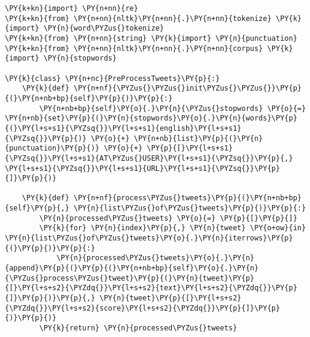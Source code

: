     \begin{tcolorbox}[breakable, size=fbox, boxrule=1pt, pad at break*=1mm,colback=cellbackground, colframe=cellborder]
\begin{Verbatim}[commandchars=\\\{\}]
\PY{k+kn}{import} \PY{n+nn}{re}
\PY{k+kn}{from} \PY{n+nn}{nltk}\PY{n+nn}{.}\PY{n+nn}{tokenize} \PY{k}{import} \PY{n}{word\PYZus{}tokenize}
\PY{k+kn}{from} \PY{n+nn}{string} \PY{k}{import} \PY{n}{punctuation}
\PY{k+kn}{from} \PY{n+nn}{nltk}\PY{n+nn}{.}\PY{n+nn}{corpus} \PY{k}{import} \PY{n}{stopwords}

\PY{k}{class} \PY{n+nc}{PreProcessTweets}\PY{p}{:}
    \PY{k}{def} \PY{n+nf}{\PYZus{}\PYZus{}init\PYZus{}\PYZus{}}\PY{p}{(}\PY{n+nb+bp}{self}\PY{p}{)}\PY{p}{:}
        \PY{n+nb+bp}{self}\PY{o}{.}\PY{n}{\PYZus{}stopwords} \PY{o}{=} \PY{n+nb}{set}\PY{p}{(}\PY{n}{stopwords}\PY{o}{.}\PY{n}{words}\PY{p}{(}\PY{l+s+s1}{\PYZsq{}}\PY{l+s+s1}{english}\PY{l+s+s1}{\PYZsq{}}\PY{p}{)} \PY{o}{+} \PY{n+nb}{list}\PY{p}{(}\PY{n}{punctuation}\PY{p}{)} \PY{o}{+} \PY{p}{[}\PY{l+s+s1}{\PYZsq{}}\PY{l+s+s1}{AT\PYZus{}USER}\PY{l+s+s1}{\PYZsq{}}\PY{p}{,} \PY{l+s+s1}{\PYZsq{}}\PY{l+s+s1}{URL}\PY{l+s+s1}{\PYZsq{}}\PY{p}{]}\PY{p}{)}

    \PY{k}{def} \PY{n+nf}{process\PYZus{}tweets}\PY{p}{(}\PY{n+nb+bp}{self}\PY{p}{,} \PY{n}{list\PYZus{}of\PYZus{}tweets}\PY{p}{)}\PY{p}{:}
        \PY{n}{processed\PYZus{}tweets} \PY{o}{=} \PY{p}{[}\PY{p}{]}
        \PY{k}{for} \PY{n}{index}\PY{p}{,} \PY{n}{tweet} \PY{o+ow}{in} \PY{n}{list\PYZus{}of\PYZus{}tweets}\PY{o}{.}\PY{n}{iterrows}\PY{p}{(}\PY{p}{)}\PY{p}{:}
            \PY{n}{processed\PYZus{}tweets}\PY{o}{.}\PY{n}{append}\PY{p}{(}\PY{p}{(}\PY{n+nb+bp}{self}\PY{o}{.}\PY{n}{\PYZus{}process\PYZus{}tweet}\PY{p}{(}\PY{n}{tweet}\PY{p}{[}\PY{l+s+s2}{\PYZdq{}}\PY{l+s+s2}{text}\PY{l+s+s2}{\PYZdq{}}\PY{p}{]}\PY{p}{)}\PY{p}{,} \PY{n}{tweet}\PY{p}{[}\PY{l+s+s2}{\PYZdq{}}\PY{l+s+s2}{score}\PY{l+s+s2}{\PYZdq{}}\PY{p}{]}\PY{p}{)}\PY{p}{)}
        \PY{k}{return} \PY{n}{processed\PYZus{}tweets}


\end{Verbatim}
\end{tcolorbox}
